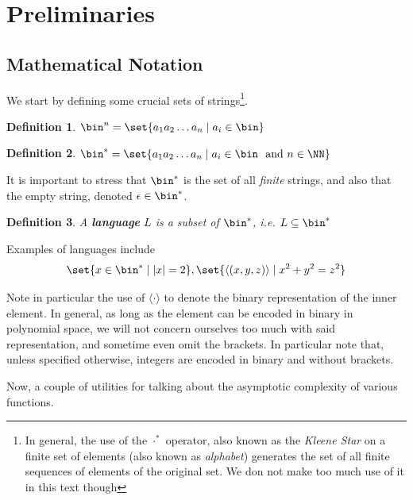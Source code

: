 \documentclass{article}
\newtheorem{definition}{Definition}
\begin{document}
\section{Preliminaries}
\label{preliminaries}
\subsection{Mathematical Notation}
We start by defining some crucial sets of strings\footnote{In general, the use of the $\cdot ^ *$ operator, also known as the \textit{Kleene Star} on a finite set of elements (also known as \textit{alphabet}) generates the set of all finite sequences of elements of the original set. We don not make too much use of it in this text though}.
\begin{definition}
    $\bin^n = \set{ a_1 a_2 \dots a_n \mid a_i \in \bin}$
\end{definition}
\begin{definition}
    $\bin^* = \set{ a_1 a_2 \dots a_n \mid a_i \in \bin \text{ \normalfont{ and }} n \in \NN }$
\end{definition}

It is important to stress that $\bin^*$ is the set of all \textit{finite} strings, and also that the empty string, denoted $\epsilon \in \bin^*$.

\begin{definition}
    A \textbf{language} $L$ is a subset of $\bin^*$, i.e. $L \subseteq \bin^*$
\end{definition}

Examples of languages include
\[ \set{ x \in \bin^* \mid |x| = 2 }, \set{ \langle(x, y, z)\rangle \mid x^2 + y^2 = z^2 } \]

Note in particular the use of $\langle \cdot \rangle$ to denote the binary representation of the inner element. In general, as long as the element can be encoded in binary in polynomial space, we will not concern ourselves too much with said representation, and sometime even omit the brackets. In particular note that, unless specified otherwise, integers are encoded in binary and without brackets.  \par

Now, a couple of utilities for talking about the asymptotic complexity of various functions.
\end{document}
